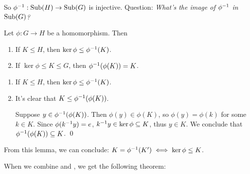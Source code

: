 So $\phi^{-1}:\operatorname{Sub}(H)\to \operatorname{Sub}(G)$ is injective. Question: \textit{What's the image of $\phi^{-1}$ in $\operatorname{Sub}(G)$?}

\begin{lemma}
Let $\phi:G\to H$ be a homomorphism. Then 
\begin{enumerate}[label=(\alph*)]
\item If $K\le H$, then $\ker\phi\le \phi^{-1}(K)$.
\item If $\ker\phi\le K\le G$, then $\phi^{-1}(\phi(K))=K$.
\end{enumerate}
\end{lemma}

\begin{pfno}
\begin{enumerate}[label=(\alph*)]
\item If $K\le H$, then $\ker\phi\le \phi^{-1}(K)$.
\item It's clear that $K\le \phi^{-1}(\phi(K))$.

Suppose $y\in\phi^{-1}(\phi(K))$. Then $\phi(y)\in\phi(K)$, so $\phi(y)=\phi(k)$ for some $k\in K$. Since $\phi(k^{-1} y)=e$, $k^{-1} y\in \ker\phi\subseteq K$, thus $y\in K$. We conclude that $\phi^{-1}(\phi(K))\subseteq K$. \qed
\end{enumerate}
\end{pfno}
From this lemma, we can conclude: $K=\phi^{-1}(K')\iff\ker\phi\le K$.

When we combine  and , we get the following theorem:

